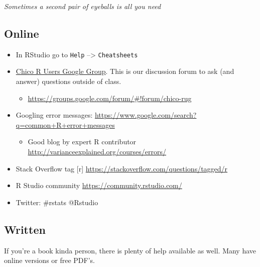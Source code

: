 \documentclass[]{article}
\providecommand{\tightlist}{%
  \setlength{\itemsep}{0pt}\setlength{\parskip}{0pt}}
\begin{document}
\emph{Sometimes a second pair of eyeballs is all you need}

\hypertarget{online}{%
\subsection{Online}\label{online}}

\begin{itemize}
\tightlist
\item
  In RStudio go to \texttt{Help} --\textgreater{} \texttt{Cheatsheets}
\item
  \href{https://groups.google.com/forum/\#!forum/chico-rug}{Chico R
  Users Google Group}. This is our discussion forum to ask (and answer)
  questions outside of class.

  \begin{itemize}
  \tightlist
  \item
    \url{https://groups.google.com/forum/\#!forum/chico-rug}
  \end{itemize}
\item
  Googling error messages:
  \url{https://www.google.com/search?q=common+R+error+messages}

  \begin{itemize}
  \tightlist
  \item
    Good blog by expert R contributor
    \url{http://varianceexplained.org/courses/errors/}
  \end{itemize}
\item
  Stack Overflow tag {[}r{]}
  \url{https://stackoverflow.com/questions/tagged/r}
\item
  R Studio community \url{https://community.rstudio.com/}
\item
  Twitter: \#rstats @Rstudio
\end{itemize}

\hypertarget{written}{%
\subsection{Written}\label{written}}

If you're a book kinda person, there is plenty of help available as
well. Many have online versions or free PDF's.
\end{document}
